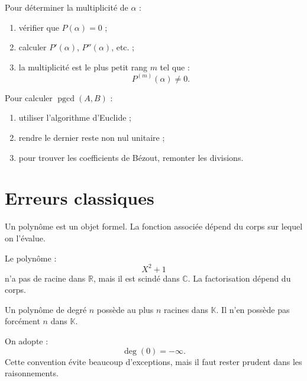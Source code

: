 \documentclass[11pt,a4paper]{article}
\newcommand{\K}{\mathbb K}
\newcommand{\R}{\mathbb R}
\newcommand{\C}{\mathbb C}
\newcommand{\pgcd}{\operatorname{pgcd}}
\begin{document}
\begin{methodbox}
Pour déterminer la multiplicité de \(\alpha\) :
\begin{enumerate}
    \item vérifier que \(P(\alpha)=0\) ;
    \item calculer \(P'(\alpha)\), \(P''(\alpha)\), etc. ;
    \item la multiplicité est le plus petit rang \(m\) tel que :
    \[
    P^{(m)}(\alpha)\neq0.
    \]
\end{enumerate}
\end{methodbox}

\begin{methodbox}
Pour calculer \(\pgcd(A,B)\) :
\begin{enumerate}
    \item utiliser l'algorithme d'Euclide ;
    \item rendre le dernier reste non nul unitaire ;
    \item pour trouver les coefficients de Bézout, remonter les divisions.
\end{enumerate}
\end{methodbox}

\section{Erreurs classiques}

\begin{erreurbox}
Un polynôme est un objet formel.  
La fonction associée dépend du corps sur lequel on l'évalue.
\end{erreurbox}

\begin{erreurbox}
Le polynôme :
\[
X^2+1
\]
n'a pas de racine dans \(\R\), mais il est scindé dans \(\C\).  
La factorisation dépend du corps.
\end{erreurbox}

\begin{erreurbox}
Un polynôme de degré \(n\) possède au plus \(n\) racines dans \(\K\).  
Il n'en possède pas forcément \(n\) dans \(\K\).
\end{erreurbox}

\begin{erreurbox}
On adopte :
\[
\deg(0)=-\infty.
\]
Cette convention évite beaucoup d'exceptions, mais il faut rester prudent dans les raisonnements.
\end{erreurbox}
\end{document}
